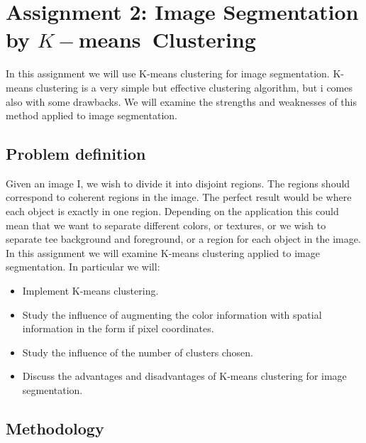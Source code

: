 \section{Assignment 2: Image Segmentation by \texorpdfstring{$K-$means}\ \ Clustering}
\label{sec:assignment2}

In this assignment we will use K-means clustering for image segmentation. K-means clustering is a very simple but effective clustering algorithm, but i comes also with some drawbacks. We will examine the strengths and weaknesses of this method applied to image segmentation.

\subsection{Problem definition}

Given an image I, we wish to divide it into disjoint regions. The regions should correspond to coherent regions in the image. The perfect result would be where each object is exactly in one region. Depending on the application this could mean that we want to separate different colors, or textures, or we wish to separate tee background and foreground, or a region for each object in the image. In this assignment we will examine K-means clustering applied to image segmentation.
 In particular we will:
\begin{itemize}
	\item Implement K-means clustering.
	\item Study the influence of augmenting the color information with spatial information in the form if pixel coordinates.
	\item Study the influence of the number of clusters chosen.
	\item Discuss the advantages and disadvantages of K-means clustering for image segmentation.
\end{itemize}

\subsection{Methodology}

